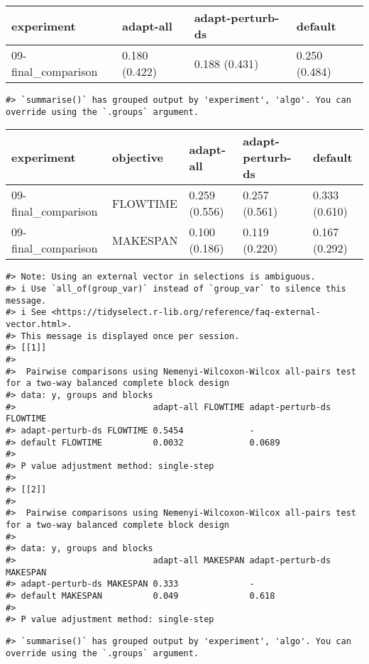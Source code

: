\documentclass[
]{article}
\begin{document}
\begin{tabular}{llll}
\toprule
experiment & adapt-all & adapt-perturb-ds & default\\
\midrule
09-final\_comparison & 0.180 (0.422) & 0.188 (0.431) & 0.250 (0.484)\\
\bottomrule
\end{tabular}

\begin{verbatim}
#> `summarise()` has grouped output by 'experiment', 'algo'. You can override using the `.groups` argument.
\end{verbatim}

\begin{longtable}[]{@{}lllll@{}}
\toprule
experiment & objective & adapt-all & adapt-perturb-ds & default \\
\midrule
\endhead
09-final\_comparison & FLOWTIME & 0.259 (0.556) & 0.257 (0.561) & 0.333
(0.610) \\
09-final\_comparison & MAKESPAN & 0.100 (0.186) & 0.119 (0.220) & 0.167
(0.292) \\
\bottomrule
\end{longtable}

\begin{verbatim}
#> Note: Using an external vector in selections is ambiguous.
#> i Use `all_of(group_var)` instead of `group_var` to silence this message.
#> i See <https://tidyselect.r-lib.org/reference/faq-external-vector.html>.
#> This message is displayed once per session.
#> [[1]]
#> 
#>  Pairwise comparisons using Nemenyi-Wilcoxon-Wilcox all-pairs test for a two-way balanced complete block design
#> data: y, groups and blocks
#>                           adapt-all FLOWTIME adapt-perturb-ds FLOWTIME
#> adapt-perturb-ds FLOWTIME 0.5454             -                        
#> default FLOWTIME          0.0032             0.0689
#> 
#> P value adjustment method: single-step
#> 
#> [[2]]
#> 
#>  Pairwise comparisons using Nemenyi-Wilcoxon-Wilcox all-pairs test for a two-way balanced complete block design
#> 
#> data: y, groups and blocks
#>                           adapt-all MAKESPAN adapt-perturb-ds MAKESPAN
#> adapt-perturb-ds MAKESPAN 0.333              -                        
#> default MAKESPAN          0.049              0.618
#> 
#> P value adjustment method: single-step
\end{verbatim}

\begin{verbatim}
#> `summarise()` has grouped output by 'experiment', 'algo'. You can override using the `.groups` argument.
\end{verbatim}
\end{document}
